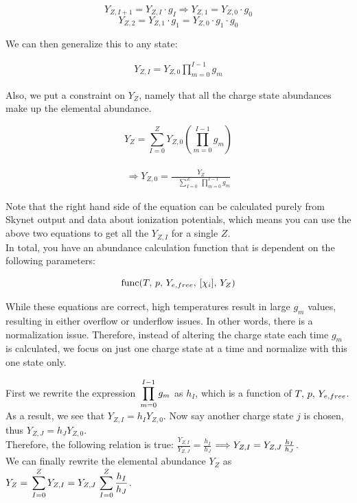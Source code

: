 \documentclass[11pt,a4paper]{article}
\begin{document}
$$ Y_{Z,I+1} = Y_{Z,I} \cdot g_I \Longrightarrow  Y_{Z,1} = Y_{Z,0} \cdot g_0 $$   $$ Y_{Z,2} = Y_{Z,1} \cdot g_1 = Y_{Z,0} \cdot g_1 \cdot g_0 $$

We can then generalize this to any state: 

\begin{align} 
Y_{Z,I} = Y_{Z,0} \prod_{m=0}^{I - 1} g_m 
\end{align}

Also, we put a constraint on $Y_Z$, namely that all the charge state abundances make up the elemental abundance.  

$$ Y_Z = \sum_{I=0}^{Z} Y_{Z,0} \left(\prod_{m=0}^{I - 1} g_m\right) $$\\
\begin{align} 
\Longrightarrow Y_{Z,0} = \frac{Y_Z}{\quad \displaystyle \sum_{I=0}^{Z} \medspace \prod_{m=0}^{I - 1} g_m}
\end{align}

Note that the right hand side of the equation can be calculated purely from Skynet output and data about ionization potentials, which means you can use the above two equations to get all the $Y_{Z,I}$ for a single $Z$. 
\\
In total, you have an abundance calculation function that is dependent on the following parameters:

$$\mathrm{func}(T,\thinspace p,\thinspace Y_{e,free},\thinspace [\chi_i],\thinspace Y_Z)$$

While these equations are correct, high temperatures result in large $g_m$ values, resulting in either overflow or underflow issues. In other words, there is a normalization issue. Therefore, instead of altering the charge state each time $g_m$ is calculated, we focus on just one charge state at a time and normalize with this one state only. 

First we rewrite the expression  $\thinspace \displaystyle \prod_{m=0}^{I - 1} g_m$ as $h_I$, which is a function of $T,\thinspace p,\thinspace Y_{e,free}$. \\

As a result, we see that $Y_{Z,I} = h_I  Y_{Z,0}$. Now say another charge state $j$ is chosen, thus $Y_{Z,J} = h_J  Y_{Z,0}$. \\

Therefore, the following relation is true:
$\frac{Y_{Z,I}}{Y_{Z,J}} = \frac{h_I}{h_J} $ $\Longrightarrow
Y_{Z,I} = Y_{Z,J}\thinspace \frac{h_I}{h_J}$. \\

We can finally rewrite the elemental abundance $Y_Z$ as $Y_Z =\thinspace \displaystyle \sum_{I=0}^{Z} Y_{Z,I} = Y_{Z,J}\thinspace \displaystyle \sum_{I=0}^{Z} \frac{h_I}{h_J} $.\\
\end{document}
